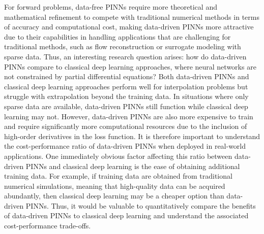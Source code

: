 For forward problems, data-free PINNs require more theoretical and mathematical refinement to compete with traditional numerical methods in terms of accuracy and computational cost, making data-driven PINNs more attractive due to their capabilities in handling applications that are challenging for traditional methods, such as flow reconstruction or surrogate modeling with sparse data.
Thus, an interesting research question arises: how do data-driven PINNs compare to classical deep learning approaches, where neural networks are not constrained by partial differential equations?
Both data-driven PINNs and classical deep learning approaches perform well for interpolation problems but struggle with extrapolation beyond the training data.
In situations where only sparse data are available, data-driven PINNs still function while classical deep learning may not.
However, data-driven PINNs are also more expensive to train and require significantly more computational resources due to the inclusion of high-order derivatives in the loss function.
It is therefore important to understand the cost-performance ratio of data-driven PINNs when deployed in real-world applications.
One immediately obvious factor affecting this ratio between data-driven PINNs and classical deep learning is the ease of obtaining additional training data.
For example, if training data are obtained from traditional numerical simulations, meaning that high-quality data can be acquired abundantly, then classical deep learning may be a cheaper option than data-driven PINNs.
Thus, it would be valuable to quantitatively compare the benefits of data-driven PINNs to classical deep learning and understand the associated cost-performance trade-offs.

